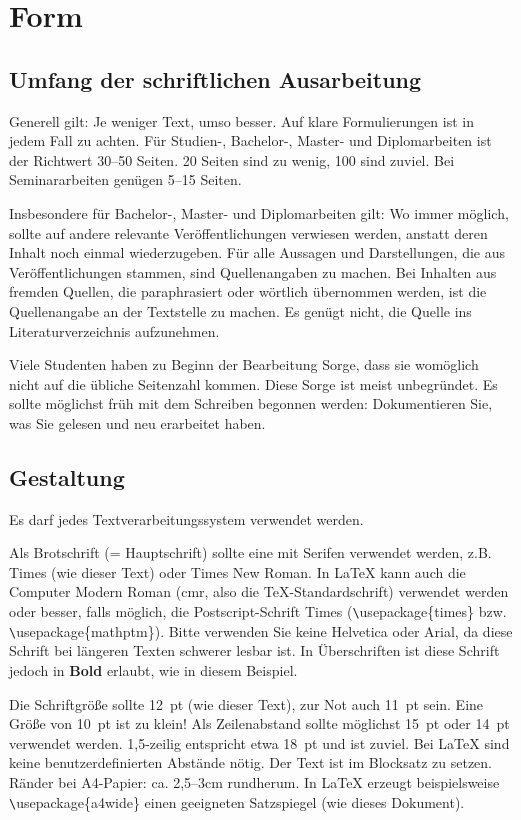 \documentclass[12pt]{scrartcl}
\begin{document}
\section{Form}

\subsection{Umfang der schriftlichen Ausarbeitung}

Generell gilt: Je weniger Text, umso besser. Auf klare Formulierungen ist in jedem Fall zu achten. Für Studien-, Bachelor-, Master- und Diplomarbeiten ist der Richtwert 30--50 Seiten. 20 Seiten sind zu wenig, 100 sind zuviel. Bei Seminararbeiten genügen 5--15 Seiten.

Insbesondere für Bachelor-, Master- und Diplomarbeiten gilt: Wo immer möglich, sollte auf andere relevante Veröffentlichungen verwiesen werden, anstatt deren Inhalt noch einmal wiederzugeben. Für alle Aussagen und Darstellungen, die aus Veröffentlichungen stammen, sind Quellenangaben zu machen. Bei Inhalten aus fremden Quellen, die paraphrasiert oder wörtlich übernommen werden, ist die Quellenangabe an der Textstelle zu machen. Es genügt nicht, die Quelle ins Literaturverzeichnis aufzunehmen.

Viele Studenten haben zu Beginn der Bearbeitung Sorge, dass sie womöglich nicht auf die \glqq übliche\grqq\/ Seitenzahl kommen. Diese Sorge ist meist unbegründet. Es sollte möglichst früh mit dem Schreiben begonnen werden: Dokumentieren Sie, was Sie gelesen und neu erarbeitet haben.

\subsection{Gestaltung}

Es darf jedes Textverarbeitungssystem verwendet werden. 

Als Brotschrift (= Hauptschrift) sollte eine mit Serifen verwendet werden, z.B. Times (wie dieser Text) oder Times New Roman. In LaTeX kann auch die Computer Modern Roman (cmr, also die TeX-Standardschrift) verwendet werden oder besser, falls möglich, die Postscript-Schrift Times (\verb|\|usepackage\{times\} bzw. \verb|\|usepackage\{mathptm\}). Bitte verwenden Sie keine \textsf{Helvetica} oder \textsf{Arial}, da diese Schrift bei längeren Texten schwerer lesbar ist. In Überschriften ist diese Schrift jedoch in \textsf{\textbf{Bold}} erlaubt, wie in diesem Beispiel.

Die Schriftgröße sollte 12~pt (wie dieser Text), zur Not auch 11~pt sein. Eine Größe von 10~pt ist zu klein!
%
Als Zeilenabstand sollte möglichst 15~pt oder 14~pt verwendet werden. 1,5-zeilig entspricht etwa 18~pt und ist zuviel. Bei LaTeX sind keine benutzerdefinierten Abstände nötig. 
%
Der Text ist im Blocksatz zu setzen. Ränder bei A4-Papier: ca. 2,5--3cm rundherum. In LaTeX erzeugt beispielsweise \verb|\|usepackage\{a4wide\} einen geeigneten Satzspiegel (wie dieses Dokument).
\end{document}
